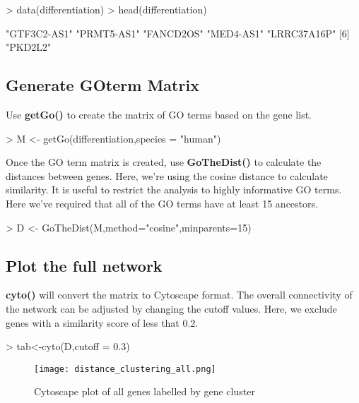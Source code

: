 \documentclass{article}
\begin{document}
\begin{Schunk}
\begin{Sinput}
> data(differentiation)
> head(differentiation)
\end{Sinput}
\begin{Soutput}
[1] "GTF3C2-AS1" "PRMT5-AS1"  "FANCD2OS"   "MED4-AS1"   "LRRC37A16P"
[6] "PKD2L2"    
\end{Soutput}
\end{Schunk}

\subsection*{Generate GOterm Matrix}
Use \textbf{getGo()} to create the matrix of GO terms based on the gene list.
\begin{Schunk}
\begin{Sinput}
> M <- getGo(differentiation,species = "human")
\end{Sinput}
\end{Schunk}


Once the GO term matrix is created, use \textbf{GoTheDist()} to calculate the distances between genes. Here, we're using the cosine distance to calculate similarity. It is useful to restrict the analysis to highly informative GO terms. Here we've required that all of the GO terms have at least 15 ancestors. 
\vspace{5mm}

\begin{Schunk}
\begin{Sinput}
> D <- GoTheDist(M,method="cosine",minparents=15)
\end{Sinput}
\end{Schunk}

\subsection*{Plot the full network}
\textbf{cyto()} will convert the matrix to Cytoscape format. The overall connectivity of the network can be adjusted by changing the cutoff values. Here, we exclude genes with a similarity score of less that 0.2.
\vspace{5mm}
\begin{Schunk}
\begin{Sinput}
> tab<-cyto(D,cutoff = 0.3)
\end{Sinput}
\end{Schunk}
\begin{figure}[ht]
\texttt{[image: distance\_clustering\_all.png]}
\centering
\caption{Cytoscape plot of all genes labelled by gene cluster}
\end{figure}
\end{document}
